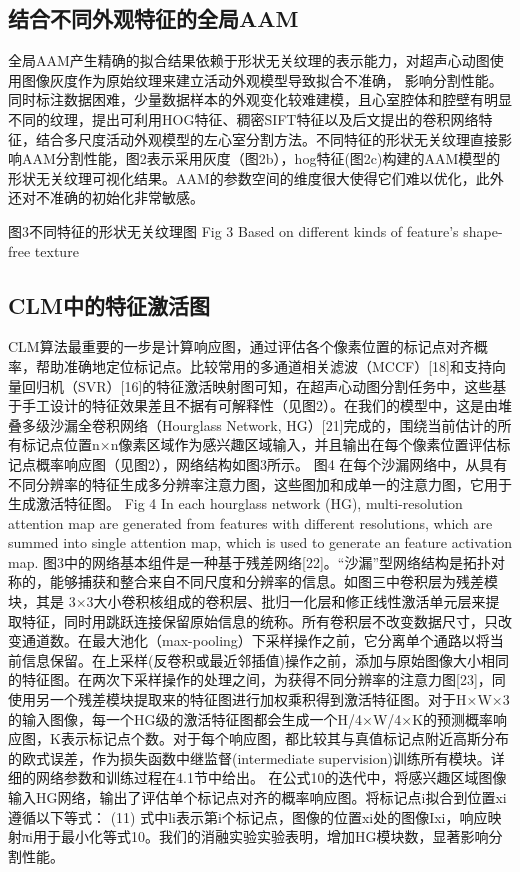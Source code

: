 \subsection{结合不同外观特征的全局AAM}
全局AAM产生精确的拟合结果依赖于形状无关纹理的表示能力，对超声心动图使用图像灰度作为原始纹理来建立活动外观模型导致拟合不准确， 影响分割性能。同时标注数据困难，少量数据样本的外观变化较难建模，且心室腔体和腔壁有明显不同的纹理，提出可利用HOG特征、稠密SIFT特征以及后文提出的卷积网络特征，结合多尺度活动外观模型的左心室分割方法。不同特征的形状无关纹理直接影响AAM分割性能，图2表示采用灰度（图2b），hog特征(图2c)构建的AAM模型的形状无关纹理可视化结果。AAM的参数空间的维度很大使得它们难以优化，此外还对不准确的初始化非常敏感。
 
图3不同特征的形状无关纹理图
Fig 3 Based on different kinds of feature’s shape-free texture

\subsection{CLM中的特征激活图}
CLM算法最重要的一步是计算响应图，通过评估各个像素位置的标记点对齐概率，帮助准确地定位标记点。比较常用的多通道相关滤波（MCCF）[18]和支持向量回归机（SVR）[16]的特征激活映射图可知，在超声心动图分割任务中，这些基于手工设计的特征效果差且不据有可解释性（见图2）。在我们的模型中，这是由堆叠多级沙漏全卷积网络（Hourglass Network, HG）[21]完成的，围绕当前估计的所有标记点位置n×n像素区域作为感兴趣区域输入，并且输出在每个像素位置评估标记点概率响应图（见图2），网络结构如图3所示。 
图4 在每个沙漏网络中，从具有不同分辨率的特征生成多分辨率注意力图，这些图加和成单一的注意力图，它用于生成激活特征图。
Fig 4 In each hourglass network (HG), multi-resolution attention map are generated from features with different resolutions, which are summed into single attention map, which is used to generate an feature activation map.
	图3中的网络基本组件是一种基于残差网络[22]。“沙漏”型网络结构是拓扑对称的，能够捕获和整合来自不同尺度和分辨率的信息。如图三中卷积层为残差模块，其是 3×3大小卷积核组成的卷积层、批归一化层和修正线性激活单元层来提取特征，同时用跳跃连接保留原始信息的统称。所有卷积层不改变数据尺寸，只改变通道数。在最大池化（max-pooling）下采样操作之前，它分离单个通路以将当前信息保留。在上采样(反卷积或最近邻插值)操作之前，添加与原始图像大小相同的特征图。在两次下采样操作的处理之间，为获得不同分辨率的注意力图[23]，同使用另一个残差模块提取来的特征图进行加权乘积得到激活特征图。对于H×W×3的输入图像，每一个HG级的激活特征图都会生成一个H/4×W/4×K的预测概率响应图，K表示标记点个数。对于每个响应图，都比较其与真值标记点附近高斯分布的欧式误差，作为损失函数中继监督(intermediate supervision)训练所有模块。详细的网络参数和训练过程在4.1节中给出。
在公式10的迭代中，将感兴趣区域图像输入HG网络，输出了评估单个标记点对齐的概率响应图。将标记点i拟合到位置xi遵循以下等式： 
	  	(11)
式中li表示第i个标记点，图像的位置xi处的图像Ixi，响应映射πi用于最小化等式10。我们的消融实验实验表明，增加HG模块数，显著影响分割性能。

